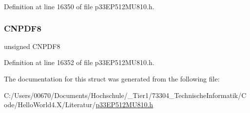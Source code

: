 Definition at line 16350 of file p33\+E\+P512\+M\+U810.\+h.

\mbox{\label{structtag_c_n_p_d_f_b_i_t_s_a1a615d2a101d01f6720621e1968b5b4c}} 
\subsubsection{\texorpdfstring{C\+N\+P\+D\+F8}{CNPDF8}}
{\footnotesize\ttfamily unsigned C\+N\+P\+D\+F8}



Definition at line 16352 of file p33\+E\+P512\+M\+U810.\+h.



The documentation for this struct was generated from the following file\+:\begin{DoxyCompactItemize}
\item 
C\+:/\+Users/00670/\+Documents/\+Hochschule/\+\_\+\+Tier1/73304\+\_\+\+Technische\+Informatik/\+Code/\+Hello\+World4.\+X/\+Literatur/\hyperlink{p33_e_p512_m_u810_8h}{p33\+E\+P512\+M\+U810.\+h}\end{DoxyCompactItemize}
